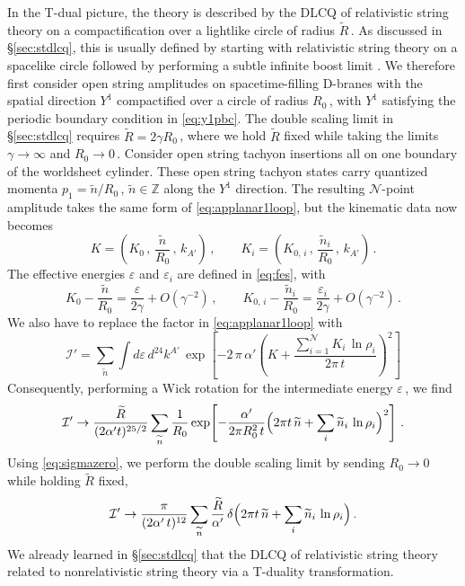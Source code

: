 \documentclass[11pt]{article}
\newcommand{\be}{\begin{equation}}
\newcommand{\ee}{\end{equation}}
\newcommand{\CI}{\mathcal{I}}
\newcommand{\CN}{\mathcal{N}}
\newcommand{\lr}{\left (}
\newcommand{\rr}{\right )}
\newcommand{\ls}{\left [}
\newcommand{\rs}{\right ]}
\renewcommand{\tilde}[1]{\widetilde{#1}}
\begin{document}
In the T-dual picture, the theory is described by the DLCQ of relativistic string theory on a compactification over a lightlike circle of radius $\tilde{R}$\,. As discussed in \S\ref{sec:stdlcq}, this is usually defined by starting with relativistic string theory on a spacelike circle followed by performing a subtle infinite boost limit \cite{Seiberg:1997ad}. We therefore first consider open string amplitudes on spacetime-filling D-branes with the spatial direction $Y^1$ compactified over a circle of radius $R_0$\,, with $Y^1$ satisfying the periodic boundary condition in \eqref{eq:y1pbc}. The double scaling limit in \S\ref{sec:stdlcq} requires $\tilde{R} = 2 \gamma R_0$\,, where we hold $\tilde{R}$ fixed while taking the limits $\gamma \rightarrow \infty$ and $R_0 \rightarrow 0$\,.  
Consider open string tachyon insertions all on one boundary of the worldsheet cylinder. These open string tachyon states carry quantized momenta $p^{}_1 = \tilde{n} / R_0$\,, $\tilde{n} \in \mathbb{Z}$ along the $Y^1$ direction. The resulting $\CN$-point amplitude takes the same form of \eqref{eq:applanar1loop}, but the kinematic data now becomes
%
\be
    K = \left( K_0\,, \, \frac{\tilde{n}}{R_0}\,, \, k_{A'} \right)\,,
        \qquad%
    K_i = \left( K_{0,\,i}\,, \, \frac{\tilde{n}_i}{R_0}\,, \, k_{A'} \right)\,.
\ee
%
The effective energies $\varepsilon$ and $\varepsilon_i$  are defined in \eqref{eq:fes}, with
%
\be
    K_0 - \frac{\tilde{n}}{R_0} = \frac{\varepsilon}{2 \gamma} + O(\gamma^{-2})\,,
        \qquad%
    K_{0,\,i} - \frac{\tilde{n}_i}{R_0} = \frac{\varepsilon_i}{2 \gamma} + O(\gamma^{-2})\,.
\ee
%
We also have to replace the factor in \eqref{eq:applanar1loop} with
%
\be
    \CI' = \sum_{\tilde{n}} \int d\varepsilon \, d^{24} k^{A'} \, \exp \! \ls - 2 \, \pi \, \alpha' \lr K + \frac{\sum_{i=1}^\CN K_i \, \ln \rho_i}{2 \pi \, t} \rr^{\!2} \rs
\ee
Consequently, performing a Wick rotation for the intermediate energy $\varepsilon$\,, we find 
%
\be
    \CI' \rightarrow \frac{\tilde{R}}{(2\alpha' t)^{25/2}} \sum_{\tilde{n}} \frac{1}{R_0} \exp \! \ls - \frac{\alpha'}{2 \pi R_0^2 \, t} \Bigl( 2 \pi t \, \tilde{n} + \sum_i \tilde{n}_i \, \ln \rho_i \Bigr)^2 \rs\,. 
\ee
%
Using \eqref{eq:sigmazero}, we perform the double scaling limit by sending $R_0 \rightarrow 0$ while holding $\tilde{R}$ fixed,
%
%
\be \label{eq:idlcq}
    \CI' \rightarrow \frac{\pi}{(2\alpha' \, t)^{12}} \sum_{\tilde{n}} \frac{\tilde{R}}{\alpha'} \, \delta \Bigl( 2\pi t \, \tilde{n} + \sum_{i} \tilde{n}_i \, \ln \rho_i \Bigr)\,.
\ee
%
We already learned in \S\ref{sec:stdlcq} that the DLCQ of relativistic string theory related to nonrelativistic string theory via a T-duality transformation.
\end{document}
